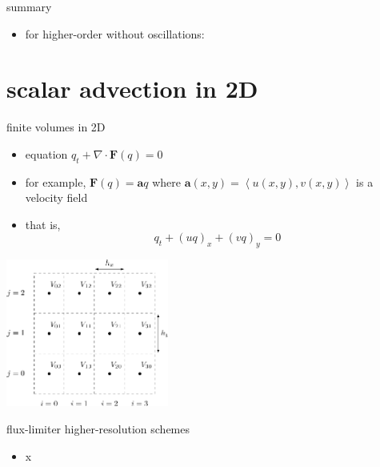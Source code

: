 \documentclass[10pt,hyperref,dvipsnames]{beamer}
\newcommand{\ba}{\mathbf{a}}
\newcommand{\bF}{\mathbf{F}}
\newcommand{\Div}{\nabla\cdot}
\begin{document}
\begin{frame}{summary}
\begin{itemize}
\begin{itemize}
\begin{itemize}
        \item for higher-order without oscillations:
        \end{itemize}
    \end{itemize}
\end{itemize}
\end{frame}


\section{scalar advection in 2D}

\begin{frame}{finite volumes in 2D}

\begin{itemize}
\item equation $q_t + \Div \bF(q) = 0$
\item for example, $\bF(q) = \ba q$ where $\ba(x,y) = \left<u(x,y), v(x,y)\right>$ is a velocity field
\item that is,
    $$q_t + (u q)_x + (v q)_y = 0$$
\end{itemize}

\hfill \includegraphics[width=0.4\textwidth]{figs/bueler11p1}
\end{frame}


\begin{frame}{flux-limiter higher-resolution schemes}

\begin{itemize}
\item x
\end{itemize}
\end{frame}
\end{document}
